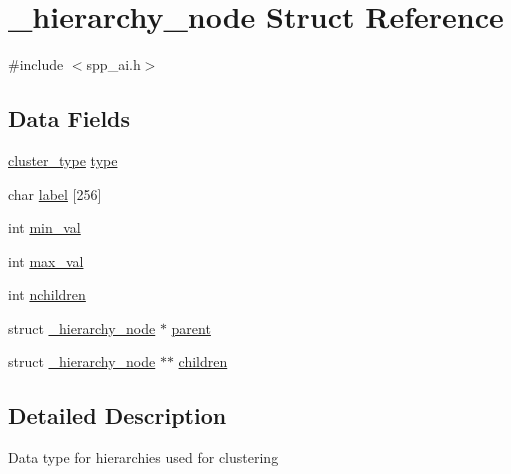 \hypertarget{struct__hierarchy__node}{
\section{\_\-hierarchy\_\-node Struct Reference}
\label{struct__hierarchy__node}
}


{\ttfamily \#include $<$spp\_\-ai.h$>$}

\subsection*{Data Fields}
\begin{DoxyCompactItemize}
\item 
\hyperlink{spp__ai_8h_ae2ff3c6586aa2ab211a102abfde86640}{cluster\_\-type} \hyperlink{struct__hierarchy__node_a3b18e3ddfa2212c5e4ff9c0b4bde4296}{type}
\item 
char \hyperlink{struct__hierarchy__node_ae498f6fd14ca058a3ae0a95d5425451a}{label} \mbox{[}256\mbox{]}
\item 
int \hyperlink{struct__hierarchy__node_a13ceebd7b435b9ef347fb90d9e6bbfe4}{min\_\-val}
\item 
int \hyperlink{struct__hierarchy__node_a79ea88029938dc30ab8f159405d12c87}{max\_\-val}
\item 
int \hyperlink{struct__hierarchy__node_a849256ce1039e2cefaaf64d91171be0a}{nchildren}
\item 
struct \hyperlink{struct__hierarchy__node}{\_\-hierarchy\_\-node} $\ast$ \hyperlink{struct__hierarchy__node_a5c94c89d7e2aea393f1c550afb766bbe}{parent}
\item 
struct \hyperlink{struct__hierarchy__node}{\_\-hierarchy\_\-node} $\ast$$\ast$ \hyperlink{struct__hierarchy__node_afc23d4fe6426873164cdaab2f3d4f0cd}{children}
\end{DoxyCompactItemize}


\subsection{Detailed Description}
Data type for hierarchies used for clustering 

